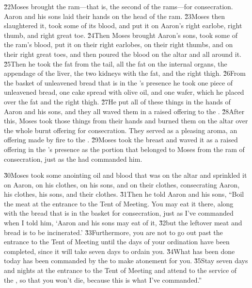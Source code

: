 \v{22}Moses brought the ram---that is, the second of the rams---for consecration. Aaron and his sons laid their hands on the head of the ram. \v{23}Moses then slaughtered it, took some of its blood, and put it on Aaron's right earlobe, right thumb, and right great toe. \v{24}Then Moses brought Aaron's sons, took some of the ram's blood, put it on their right earlobes, on their right thumbs, and on their right great toes, and then poured the blood on the altar and all around it. \v{25}Then he took the fat from the tail, all the fat on the internal organs, the appendage of the liver, the two kidneys with the fat, and the right thigh. \v{26}From the basket of unleavened bread that is in the 's presence he took one piece of unleavened bread, one cake spread with olive oil, and one wafer, which he placed over the fat and the right thigh. \v{27}He put all of these things in the hands of Aaron and his sons, and they all waved them in a raised offering to the . \v{28}After this, Moses took those things from their hands and burned them on the altar over the whole burnt offering for consecration. They served as a pleasing aroma, an offering made by fire to the . \v{29}Moses took the breast and waved it as a raised offering in the 's presence as the portion that belonged to Moses from the ram of consecration, just as the  had commanded him.

\v{30}Moses took some anointing oil and blood that was on the altar and sprinkled it on Aaron, on his clothes, on his sons, and on their clothes, consecrating Aaron, his clothes, his sons, and their clothes. \v{31}Then he told Aaron and his sons, ``Boil the meat at the entrance to the Tent of Meeting. You may eat it there, along with the bread that is in the basket for consecration, just as I've commanded when I told him, `Aaron and his sons may eat of it, \v{32}but the leftover meat and bread is to be incinerated.' \v{33}Furthermore, you are not to go out past the entrance to the Tent of Meeting until the days of your ordination have been completed, since it will take seven days to ordain you. \v{34}What has been done today has been commanded by the  to make atonement for you. \v{35}Stay seven days and nights at the entrance to the Tent of Meeting and attend to the service of the , so that you won't die, because this is what I've commanded.''

